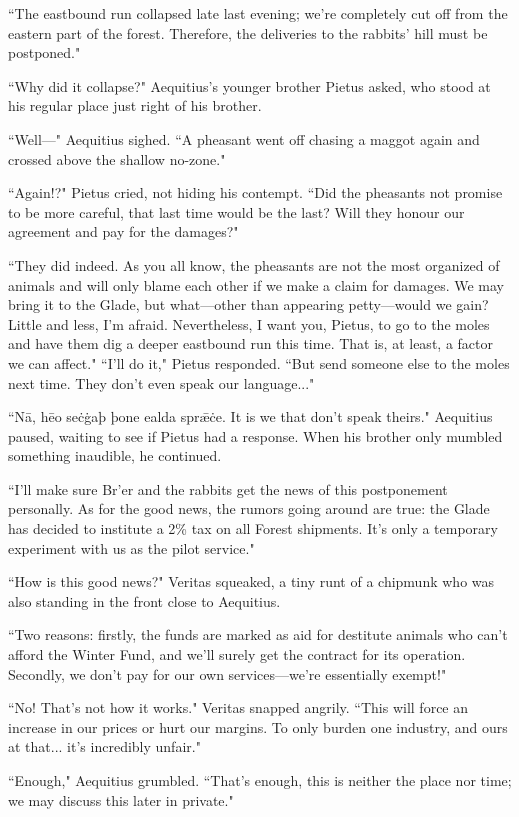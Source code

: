 ``The eastbound run collapsed late last evening; we're completely cut off from the eastern part of the forest.
Therefore, the deliveries to the rabbits' hill must be postponed."

``Why did it collapse?" Aequitius's younger brother Pietus asked, who stood at his regular place just right of his brother.

``Well---" Aequitius sighed. ``A pheasant went off chasing a maggot again and crossed above the shallow no-zone."

``Again!?" Pietus cried, not hiding his contempt.
``Did the pheasants not promise to be more careful, that last time would be the last?
Will they honour our agreement and pay for the damages?"

``They did indeed.
As you all know, the pheasants are not the most organized of animals and will only blame each other if we make a claim for damages.
We may bring it to the Glade, but what---other than appearing petty---would we gain?
Little and less, I'm afraid.
Nevertheless, I want you, Pietus, to go to the moles and have them dig a deeper eastbound run this time.
That is, at least, a factor we can affect."
``I'll do it," Pietus responded.
``But send someone else to the moles next time.
They don't even speak our language..." %

``Nā, hēo seċġaþ þone ealda sprǣċe.
It is we that don't speak theirs." Aequitius paused, waiting to see if Pietus had a response.
When his brother only mumbled something inaudible, he continued.

``I'll make sure Br'er and the rabbits get the news of this postponement personally.
As for the good news, the rumors going around are true: the Glade has decided to institute a 2\% tax on all Forest shipments.
It's only a temporary experiment with us as the pilot service."

``How is this good news?" Veritas squeaked, a tiny runt of a chipmunk who was also standing in the front close to Aequitius.

``Two reasons: firstly, the funds are marked as aid for destitute animals who can't afford the Winter Fund, and we'll surely get the contract for its operation.
Secondly, we don't pay for our own services---we're essentially exempt!"

``No! That's not how it works." Veritas snapped angrily. ``This will force an increase in our prices or hurt our margins.
To only burden one industry, and ours at that... it's incredibly unfair."

``Enough," Aequitius grumbled.
``That's enough, this is neither the place nor time; we may discuss this later in private."

